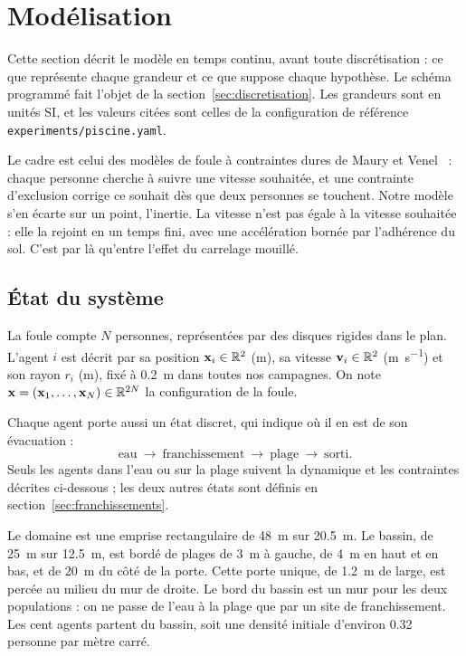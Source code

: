 \section{Modélisation}
\label{sec:modelisation}

Cette section décrit le modèle en temps continu, avant toute discrétisation :
ce que représente chaque grandeur et ce que suppose chaque hypothèse. Le schéma
programmé fait l'objet de la section~\ref{sec:discretisation}. Les grandeurs
sont en unités SI, et les valeurs citées sont celles de la configuration de
référence \texttt{experiments/piscine.yaml}.

Le cadre est celui des modèles de foule à contraintes dures de Maury et
Venel~\cite{maury2008,maury2011} : chaque personne cherche à suivre une vitesse
souhaitée, et une contrainte d'exclusion corrige ce souhait dès que deux
personnes se touchent. Notre modèle s'en écarte sur un point, l'inertie. La
vitesse n'est pas égale à la vitesse souhaitée : elle la rejoint en un temps
fini, avec une accélération bornée par l'adhérence du sol. C'est par là
qu'entre l'effet du carrelage mouillé.

\subsection{État du système}
\label{sec:etat}

La foule compte $N$ personnes, représentées par des disques rigides dans le
plan. L'agent $i$ est décrit par sa position $\mathbf{x}_i\in\mathbb{R}^2$
(\si{\metre}), sa vitesse $\mathbf{v}_i\in\mathbb{R}^2$ (\si{\metre\per\second}) et
son rayon $r_i$ (\si{\metre}), fixé à \SI{0.2}{\metre} dans toutes nos
campagnes. On note $\mathbf{x}=(\mathbf{x}_1,\dots,\mathbf{x}_N)\in\mathbb{R}^{2N}$ la
configuration de la foule.

Chaque agent porte aussi un état discret, qui indique où il en est de son
évacuation :
\[
\text{eau}\ \longrightarrow\ \text{franchissement}\ \longrightarrow\
\text{plage}\ \longrightarrow\ \text{sorti}.
\]
Seuls les agents dans l'eau ou sur la plage suivent la dynamique et les
contraintes décrites ci-dessous ; les deux autres états sont définis en
section~\ref{sec:franchissements}.

Le domaine est une emprise rectangulaire de \SI{48}{\metre} sur
\SI{20.5}{\metre}. Le bassin, de \SI{25}{\metre} sur \SI{12.5}{\metre}, est
bordé de plages de \SI{3}{\metre} à gauche, de \SI{4}{\metre} en haut et en bas,
et de \SI{20}{\metre} du côté de la porte. Cette porte unique, de
\SI{1.2}{\metre} de large, est percée au milieu du mur de droite. Le bord du
bassin est un mur pour les deux populations : on ne passe de l'eau à la plage
que par un site de franchissement. Les cent agents partent du bassin, soit une
densité initiale d'environ \num{0.32} personne par mètre carré.

